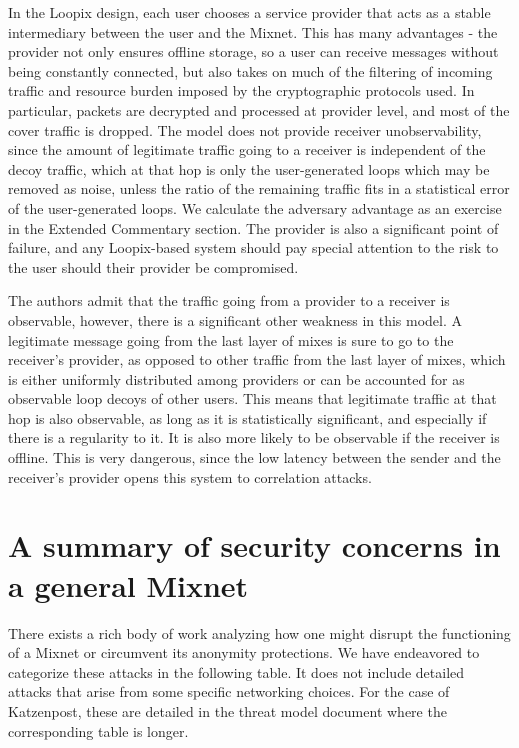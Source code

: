 \documentclass{article}
\begin{document}
In the Loopix design, each user chooses a service provider that acts as a stable intermediary between the user and the Mixnet. This has many advantages - the provider not only ensures offline storage, so a user can receive messages without being constantly connected, but also takes on much of the filtering of incoming traffic and resource burden imposed by the cryptographic protocols used. In particular, packets are decrypted and processed at provider level, and most of the cover traffic is dropped. The model does not provide receiver unobservability, since the amount of legitimate traffic going to a receiver is independent of the decoy traffic, which at that hop is only the user-generated loops which may be removed as noise, unless the ratio of the remaining traffic fits in a statistical error of the user-generated loops. We calculate the adversary advantage as an exercise in the Extended Commentary section. The provider is also a significant point of failure, and any Loopix-based system should pay special attention to the risk to the user should their provider be compromised.

The authors admit that the traffic going from a provider to a receiver is observable, however, there is a significant other weakness in this model. A legitimate message going from the last layer of mixes is sure to go to the receiver's provider, as opposed to other traffic from the last layer of mixes, which is either uniformly distributed among providers or can be accounted for as observable loop decoys of other users. This means that legitimate traffic at that hop is also observable, as long as it is statistically significant, and especially if there is a regularity to it. It is also more likely to be observable if the receiver is offline. This is very dangerous, since the low latency between the sender and the receiver's provider opens this system to correlation attacks.


\section{A summary of security concerns in a general Mixnet}
There exists a rich body of work analyzing how one might disrupt the functioning of a Mixnet or circumvent its anonymity protections. We have endeavored to categorize these attacks in the following table. It does not include detailed attacks that arise from some specific networking choices. For the case of Katzenpost, these are detailed in the threat model document where the corresponding table is longer.
\end{document}
